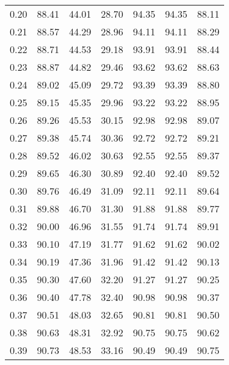 \begin{tabular}{|c|c|c|c|c|c|c|}
      0.20 &     88.41 &     44.01 &      28.70 &   94.35 &      94.35 &         88.11 \\
      0.21 &     88.57 &     44.29 &      28.96 &   94.11 &      94.11 &         88.29 \\
      0.22 &     88.71 &     44.53 &      29.18 &   93.91 &      93.91 &         88.44 \\
      0.23 &     88.87 &     44.82 &      29.46 &   93.62 &      93.62 &         88.63 \\
      0.24 &     89.02 &     45.09 &      29.72 &   93.39 &      93.39 &         88.80 \\
      0.25 &     89.15 &     45.35 &      29.96 &   93.22 &      93.22 &         88.95 \\
      0.26 &     89.26 &     45.53 &      30.15 &   92.98 &      92.98 &         89.07 \\
      0.27 &     89.38 &     45.74 &      30.36 &   92.72 &      92.72 &         89.21 \\
      0.28 &     89.52 &     46.02 &      30.63 &   92.55 &      92.55 &         89.37 \\
      0.29 &     89.65 &     46.30 &      30.89 &   92.40 &      92.40 &         89.52 \\
      0.30 &     89.76 &     46.49 &      31.09 &   92.11 &      92.11 &         89.64 \\
      0.31 &     89.88 &     46.70 &      31.30 &   91.88 &      91.88 &         89.77 \\
      0.32 &     90.00 &     46.96 &      31.55 &   91.74 &      91.74 &         89.91 \\
      0.33 &     90.10 &     47.19 &      31.77 &   91.62 &      91.62 &         90.02 \\
      0.34 &     90.19 &     47.36 &      31.96 &   91.42 &      91.42 &         90.13 \\
      0.35 &     90.30 &     47.60 &      32.20 &   91.27 &      91.27 &         90.25 \\
      0.36 &     90.40 &     47.78 &      32.40 &   90.98 &      90.98 &         90.37 \\
      0.37 &     90.51 &     48.03 &      32.65 &   90.81 &      90.81 &         90.50 \\
      0.38 &     90.63 &     48.31 &      32.92 &   90.75 &      90.75 &         90.62 \\
      0.39 &     90.73 &     48.53 &      33.16 &   90.49 &      90.49 &         90.75 \\

\end{tabular}
